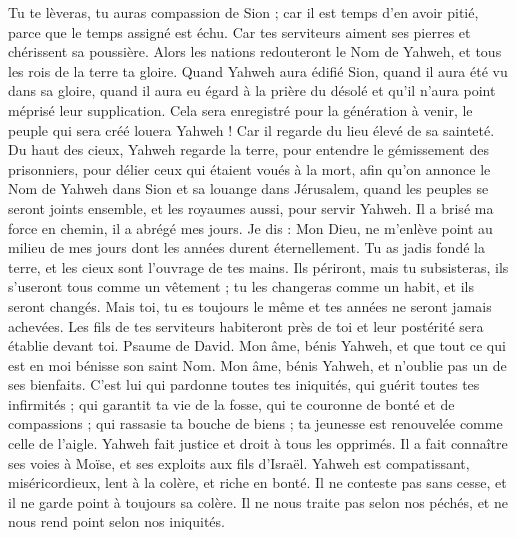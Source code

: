 \begin{multicols}{2}
Tu te lèveras, tu auras compassion de Sion ; car il est temps d'en avoir pitié, parce que le temps assigné est échu.
Car tes serviteurs aiment ses pierres et chérissent sa poussière.
Alors les nations redouteront le Nom de Yahweh, et tous les rois de la terre ta gloire.
Quand Yahweh aura édifié Sion, quand il aura été vu dans sa gloire,
quand il aura eu égard à la prière du désolé et qu'il n'aura point méprisé leur supplication.
Cela sera enregistré pour la génération à venir, le peuple qui sera créé louera Yahweh !
Car il regarde du lieu élevé de sa sainteté. Du haut des cieux, Yahweh regarde la terre,
pour entendre le gémissement des prisonniers, pour délier ceux qui étaient voués à la mort,
afin qu'on annonce le Nom de Yahweh dans Sion et sa louange dans Jérusalem,
quand les peuples se seront joints ensemble, et les royaumes aussi, pour servir Yahweh.
Il a brisé ma force en chemin, il a abrégé mes jours.
Je dis : Mon Dieu, ne m'enlève point au milieu de mes jours dont les années durent éternellement.
Tu as jadis fondé la terre, et les cieux sont l'ouvrage de tes mains.
Ils périront, mais tu subsisteras, ils s’useront tous comme un vêtement ; tu les changeras comme un habit, et ils seront changés.
Mais toi, tu es toujours le même et tes années ne seront jamais achevées.
Les fils de tes serviteurs habiteront près de toi et leur postérité sera établie devant toi.
\VerseOne{}Psaume de David. Mon âme, bénis Yahweh, et que tout ce qui est en moi bénisse son saint Nom.
Mon âme, bénis Yahweh, et n'oublie pas un de ses bienfaits.
C'est lui qui pardonne toutes tes iniquités, qui guérit toutes tes infirmités ;
qui garantit ta vie de la fosse, qui te couronne de bonté et de compassions ;
qui rassasie ta bouche de biens ; ta jeunesse est renouvelée comme celle de l'aigle.
Yahweh fait justice et droit à tous les opprimés.
Il a fait connaître ses voies à Moïse, et ses exploits aux fils d'Israël.
Yahweh est compatissant, miséricordieux, lent à la colère, et riche en bonté.
Il ne conteste pas sans cesse, et il ne garde point à toujours sa colère.
Il ne nous traite pas selon nos péchés, et ne nous rend point selon nos iniquités.

\end{multicols}

